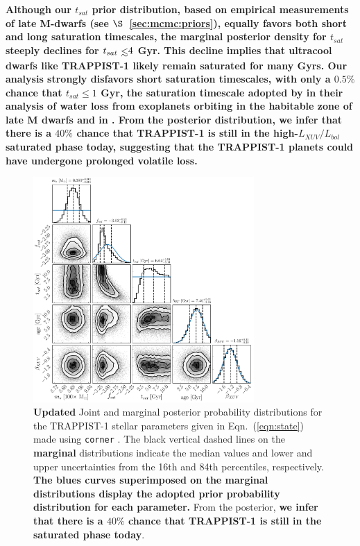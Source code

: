 \documentclass[twocolumn]{aastex62}
\def\lsim{~\rlap{$<$}{\lower 1.0ex\hbox{$\sim$}}}
\newcommand{\xxx}[1]{{\textbf{#1}}}
\begin{document}
\xxx{Although our $t_{sat}$ prior distribution, based on empirical measurements of late M-dwarfs (see $\S$~\ref{sec:mcmc:priors}), equally favors both short and long saturation timescales, the marginal posterior density for $t_{sat}$ steeply declines for $t_{sat} \lsim 4$ Gyr. This decline implies that ultracool dwarfs like TRAPPIST-1 likely remain saturated for many Gyrs. Our analysis strongly disfavors short saturation timescales, with only a $0.5\%$ chance that $t_{sat} \leq 1$ Gyr, the saturation timescale adopted by \citet{Luger2015} in their analysis of water loss from exoplanets orbiting in the habitable zone of late M dwarfs \xxx{and in \citet{Lincowski2018}}. From the posterior distribution, we infer that there is a $40\%$ chance that TRAPPIST-1 is still in the high-$L_{XUV}/L_{bol}$ saturated phase today, suggesting that the TRAPPIST-1 planets could have undergone prolonged volatile loss.}

\begin{figure}[t]
\centering
	\includegraphics[width=0.75\textwidth]{../Analysis/Corner/trappist1Corner.pdf}
   \caption{\xxx{Updated} Joint and marginal posterior probability distributions for the TRAPPIST-1 stellar parameters given in Eqn.~(\ref{eqn:state}) made using \texttt{corner} \citep{ForemanMackey2016}. The black vertical dashed lines on the \xxx{marginal} distributions indicate the median values and lower and upper uncertainties from the 16th and 84th percentiles, respectively. \xxx{The blues curves superimposed on the marginal distributions display the adopted prior probability distribution for each parameter.} From the posterior, \xxx{we infer that there is a $40\%$ chance that TRAPPIST-1 is still in the saturated phase today}.}%
    \label{fig:corner}%
\end{figure}
\end{document}
